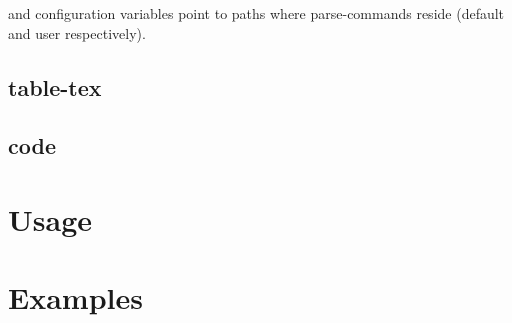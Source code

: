 \documentclass{memoir}
\begin{document}
	and  configuration variables point to paths where 
	parse-commands reside (default and user respectively).

	\section{table-tex}
	\section{code}


\chapter{Usage}
\chapter{Examples}

\printglossary
\end{document}
